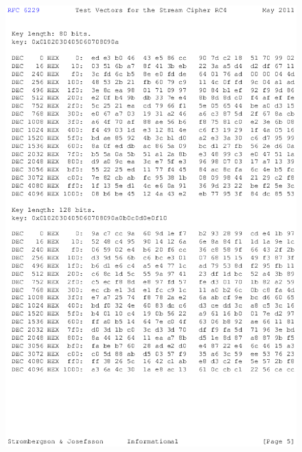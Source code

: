 \begin{anexosenv}
\begin{figure}
\centering
\includegraphics{figuras/file-4}
\end{figure}


\end{anexosenv}
